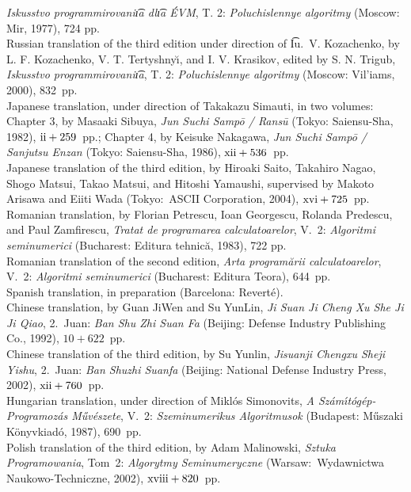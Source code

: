  {\sl Iskusstvo programmirovani\t \i a dl\t \i a \'EVM},
 T. 2: {\sl Poluchislennye algoritmy\/} (Moscow: Mir, 1977), 724 pp.
\\Russian translation of the third edition under direction of
 \t Iu.~V. Kozachenko, by L. F. Kozachenko,
 V. T. Tertyshny{\u\i}, and I. V. Krasikov,
 edited by S. N. Trigub, {\sl Iskusstvo programmirovani\t \i a}, 
 T. 2: {\sl Poluchislennye algoritmy\/} (Moscow: Vil'iams, 2000), 832~pp.
\\Japanese translation, under direction of Takakazu Simauti, in two volumes:
 Chapter 3, by Masaaki Sibuya, {\sl Jun Suchi Samp\=o / Rans\=u}
 (Tokyo: Saiensu-Sha, 1982), $\rm ii + 259$~pp.;
 Chapter 4, by Keisuke Nakagawa, {\sl Jun Suchi Samp\=o / Sanjutsu Enzan\/}
 (Tokyo: Saiensu-Sha, 1986), $\rm xii + 536$~pp.
\\Japanese translation of the third edition, by
 Hiroaki Saito, Takahiro Nagao, Shogo Matsui, Takao Matsui, and
 Hitoshi Yamaushi, supervised
 by Makoto Arisawa and Eiiti Wada (Tokyo:\ ASCII Corporation, 2004), 
 $\rm xvi+725$~pp. 
\\Romanian translation, by Florian Petrescu, Ioan Georgescu,
 Rolanda Predescu, and Paul Zamfirescu,
 {\sl Tratat de programarea calculatoarelor},
 V.~2: {\sl Algoritmi seminumerici}
 (Bucharest: Editura tehnic\u a, 1983), 722 pp.
\\Romanian translation of the second edition,
 {\sl Arta program\u{a}rii calculatoarelor\/}, V.~2:
 {\sl Algoritmi seminumerici\/} (Bucharest: Editura Teora),
 644~pp.
\\Spanish translation, in preparation (Barcelona: Revert\'e).
\\Chinese translation, by Guan JiWen and Su YunLin, {\sl Ji Suan Ji Cheng Xu
 She Ji Ji Qiao}, 2.\ Juan: {\sl Ban Shu Zhi Suan Fa\/}
 (Beijing: Defense Industry Publishing Co., 1992), $10+622$~pp.
\\Chinese translation of the third edition, by Su Yunlin,
 {\sl Jisuanji Chengxu Sheji Yishu}, 2.\ Juan: {\sl Ban Shuzhi Suanfa\/}
 (Beijing: National Defense Industry Press, 2002), $\rm xii+760$~pp.
\\Hungarian translation, under direction of Mikl\'os Simonovits,
 {\sl A Sz\'am\'\i t\'og\'ep-Programoz\'as M\H uv\'eszete}, V.~2:
 {\sl Szeminumerikus Algoritmusok\/}
 (Budapest: M\H uszaki K\"onyvkiad\'o, 1987), 690~pp.
\\Polish translation of the third edition, by Adam Malinowski,
 {\sl Sztuka Programowania}, Tom~2: {\sl Algorytmy Seminumeryczne\/}
 (Warsaw:\ Wydawnictwa Naukowo-Techniczne, 2002), $\rm xviii+820$~pp.
